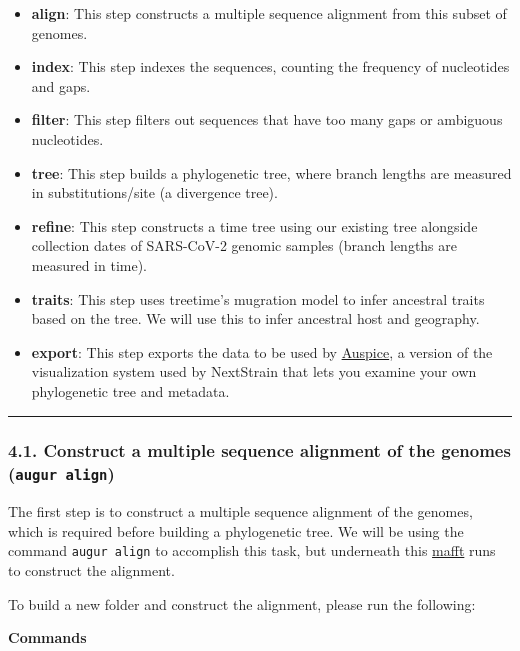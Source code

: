 \documentclass[
]{book}
\providecommand{\tightlist}{%
  \setlength{\itemsep}{0pt}\setlength{\parskip}{0pt}}
\begin{document}
\begin{itemize}
\tightlist
\item
  \textbf{align}: This step constructs a multiple sequence alignment from this subset of genomes.
\item
  \textbf{index}: This step indexes the sequences, counting the frequency of nucleotides and gaps.
\item
  \textbf{filter}: This step filters out sequences that have too many gaps or ambiguous nucleotides.
\item
  \textbf{tree}: This step builds a phylogenetic tree, where branch lengths are measured in substitutions/site (a divergence tree).
\item
  \textbf{refine}: This step constructs a time tree using our existing tree alongside collection dates of SARS-CoV-2 genomic samples (branch lengths are measured in time).
\item
  \textbf{traits}: This step uses treetime's mugration model to infer ancestral traits based on the tree. We will use this to infer ancestral host and geography.
\item
  \textbf{export}: This step exports the data to be used by \href{https://auspice.us/}{Auspice}, a version of the visualization system used by NextStrain that lets you examine your own phylogenetic tree and metadata.
\end{itemize}

\begin{center}\rule{0.5\linewidth}{0.5pt}\end{center}

\subsubsection{\texorpdfstring{4.1. Construct a multiple sequence alignment of the genomes (\texttt{augur\ align})}{4.1. Construct a multiple sequence alignment of the genomes (augur align)}}\label{construct-a-multiple-sequence-alignment-of-the-genomes-augur-align}

The first step is to construct a multiple sequence alignment of the genomes, which is required before building a phylogenetic tree. We will be using the command \texttt{augur\ align} to accomplish this task, but underneath this \href{https://mafft.cbrc.jp/alignment/software/}{mafft} runs to construct the alignment.

To build a new folder and construct the alignment, please run the following:

\textbf{Commands}
\end{document}
